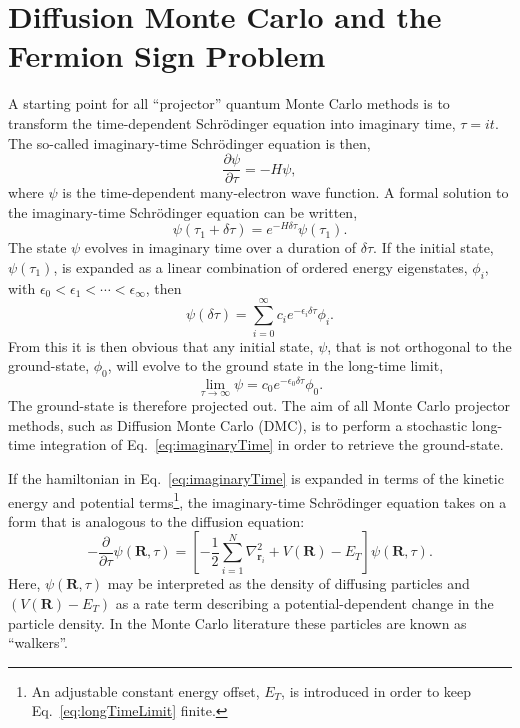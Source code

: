 \section*{Diffusion Monte Carlo and the Fermion Sign Problem}
A starting point for all ``projector'' quantum Monte Carlo methods\cite{Kent1999} is to transform the time-dependent Schr\"{o}dinger equation into imaginary time, $\tau = it$. The so-called imaginary-time Schr\"{o}dinger equation is then,
\begin{equation}
\label{eq:imaginaryTime}
\frac{\partial \psi}{\partial \tau} = - H\psi,
\end{equation}
where $\psi$ is the time-dependent many-electron wave function. A formal solution to the imaginary-time Schr\"{o}dinger equation can be written,
\begin{equation}
\label{eq:imaginaryTimeSolution}
\psi(\tau_1 + \delta \tau) = e^{-H\delta\tau}\psi(\tau_1).
\end{equation}
The state $\psi$ evolves in imaginary time over a duration of $\delta\tau$. If the initial state, $\psi(\tau_1)$, is expanded as a linear combination of ordered energy eigenstates, $\phi_i$, with $\epsilon_0 < \epsilon_1 < \dotsb < \epsilon_{\infty}$, then
\begin{equation}
\label{eq:imaginaryTimeSolutionExpansion}
\psi(\delta \tau) = \sum_{i=0}^{\infty}c_i e^{-\epsilon_i \delta\tau}\phi_i.
\end{equation}
From this it is then obvious that any initial state, $\psi$, that is not orthogonal to the ground-state, $\phi_0$, will evolve to the ground state in the long-time limit,
\begin{equation}
\label{eq:longTimeLimit}
\lim_{\tau \to \infty} \psi = c_0 e^{-\epsilon_0 \delta\tau}\phi_0.
\end{equation}
The ground-state is therefore projected out. The aim of all Monte Carlo projector methods, such as Diffusion Monte Carlo (DMC)\cite{Sorella1989}, is to perform a stochastic long-time integration of Eq.~\ref{eq:imaginaryTime} in order to retrieve the ground-state. 

If the hamiltonian in Eq.~\ref{eq:imaginaryTime} is expanded in terms of the kinetic energy and potential terms\footnote{An adjustable constant energy offset, $E_T$, is introduced in order to keep Eq.~\ref{eq:longTimeLimit} finite.}, the imaginary-time Schr\"{o}dinger equation takes on a form that is analogous to the diffusion equation:
\begin{equation}
-\frac{\partial}{\partial\tau}\psi(\textbf{R},\tau)= \left[-\frac{1}{2}\sum_{i=1}^N \nabla_{\textbf{r}_i}^2 + V(\textbf{R})-E_T\right]\psi(\textbf{R},\tau).
\end{equation}
Here, $\psi(\textbf{R},\tau)$ may be interpreted as the density of diffusing particles and $(V(\textbf{R})-E_T)$ as a rate term describing a potential-dependent change in the particle density. In the Monte Carlo literature these particles are known as ``walkers''.


